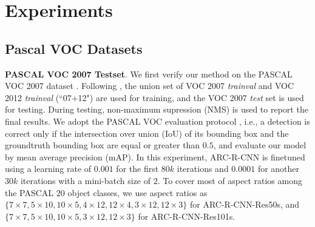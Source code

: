 \documentclass[10pt,twocolumn,letterpaper]{article}
\begin{document}
\vspace{-2mm}
\section{Experiments}
\vspace{-1mm}

\subsection{Pascal VOC Datasets}
\vspace{-1mm}
\textbf{PASCAL VOC 2007 Testset}. We first verify our method on the PASCAL VOC 2007 dataset \cite{pascal}. Following \cite{faster_rcnn,rfcn}, the union set of VOC 2007 \textit{trainval} and VOC 2012 \textit{trainval} (``07+12") are used for training, and the VOC 2007 \textit{test} set is used for testing. 
During testing, non-maximum supression (NMS) is used to report the final results.
We adopt the PASCAL VOC evaluation protocol \cite{pascal}, i.e., a detection is correct only if the intersection over union (IoU) of its bounding box and the groundtruth bounding box are equal or greater than $0.5$, and evaluate our model by mean average precision (mAP). 
In this experiment, ARC-R-CNN is finetuned using a learning rate of $0.001$ for the first $80k$ iterations and $0.0001$ for another $30k$ iterations with a mini-batch size of $2$. 
To cover most of aspect ratios among the PASCAL $20$ object classes, we use aspect ratios as $\{7\times7, 5\times10, 10\times5, 4\times12, 12\times4,3\times12, 12\times3\}$ for ARC-R-CNN-Res50s, and $\{7\times7, 5\times10, 10\times5, 3\times12, 12\times3\}$ for ARC-R-CNN-Res101s.
\end{document}
